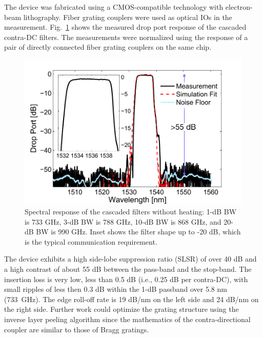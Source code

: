 \documentclass[osajnl,twocolumn,showpacs,superscriptaddress,10pt]{revtex4-1}
\begin{document}
The device was fabricated using a CMOS-compatible technology with electron-beam lithography. 
Fiber grating couplers\cite{zhong2014focusingFGC} were used as optical IOs in the measurement. 
Fig.~\ref{fig:passive} shows the measured drop port response of the cascaded contra-DC filters. 
The measurements were normalized using the response of a pair of directly connected fiber grating couplers on the same chip.
\begin{figure}[htbp]
\centering
\includegraphics[width=.99\columnwidth]{data/Passive6}
\caption{ Spectral response of the cascaded filters without heating: 1-dB BW is 733 GHz, 3-dB BW is 788 GHz, 10-dB BW is 868 GHz, and 20-dB BW is 990 GHz. Inset shows the filter shape up to -20 dB, which is the typical communication requirement.}
\label{fig:passive}
\end{figure}

The device exhibits a high side-lobe suppression ratio (SLSR) of over 40 dB and a high contrast of about 55 dB between the pass-band and the stop-band. 
The insertion loss is very low, less than 0.5 dB (i.e., 0.25 dB per contra-DC), with small ripples of less then 0.3 dB within the 1-dB passband over 5.8 nm (733~GHz). 
The edge roll-off rate is 19 dB/nm on the left side and 24 dB/nm on the right side.
Further work could optimize the grating structure using the inverse layer peeling algorithm\cite{skaar2001synthesis} since the mathematics of the contra-directional coupler are similar to those of Bragg gratings.
\end{document}
